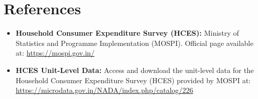 \documentclass{article}
\begin{document}
\section{References}

\begin{itemize}
	\item \textbf{Household Consumer Expenditure Survey (HCES):} Ministry of Statistics and Programme Implementation (MOSPI). Official page available at: \url{https://mospi.gov.in/}
	\item \textbf{HCES Unit-Level Data:} Access and download the unit-level data for the Household Consumer Expenditure Survey (HCES) provided by MOSPI at: \url{https://microdata.gov.in/NADA/index.php/catalog/226}
\end{itemize}

\appendix
\clearpage


	
\end{document}
